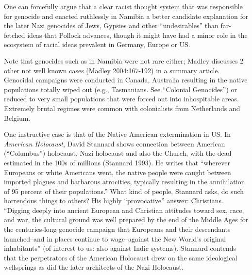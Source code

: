 One can forcefully argue that a clear racist thought system that was responsible for genocide and enacted ruthlessly in Namibia a better candidate explanation for the later Nazi genocides of  Jews, Gypsies and other “undesirables” than far-fetched ideas that Pollock advances, though it might have had a minor role in the ecosystem of racial ideas prevalent in Germany, Europe or US.
\vskip 2pt

Note that genocides such as in Namibia were not rare either; Madley discusses 2 other not well known cases (Madley 2004:167-192) in a summary article. Genocidal campaigns were conducted in Canada, Australia resulting in the native populations totally wiped out (e.g., Tasmanians. See “Colonial Genocides”) or reduced to very small populations that were forced out into inhospitable areas.  Extremely brutal regimes were common with colonialists from Netherlands and Belgium.

One instructive case is that of the Native American extermination in US\@.  In {\sl American Holocaust}, David Stannard shows connection between American (“Columbus”) holocaust, Nazi holocaust and also the Church, with the dead estimated in the 100s of millions (Stannard 1993). He writes that “wherever Europeans or white Americans went, the native people were caught between imported plagues and barbarous atrocities, typically resulting in the annihilation of 95 percent of their populations.” What kind of people, Stannard asks, do such horrendous things to others? His highly “provocative” answer: Christians. “Digging deeply into ancient European and Christian attitudes toward sex, race, and war, the cultural ground was well prepared by the end of the Middle Ages for the centuries-long genocide campaign that Europeans and their descendants launched--and in places continue to wage--against the New World's original inhabitants” (of interest to us: also against Indic systems). Stannard contends that the perpetrators of the American Holocaust drew on the same ideological wellsprings as did the later architects of the Nazi Holocaust.


